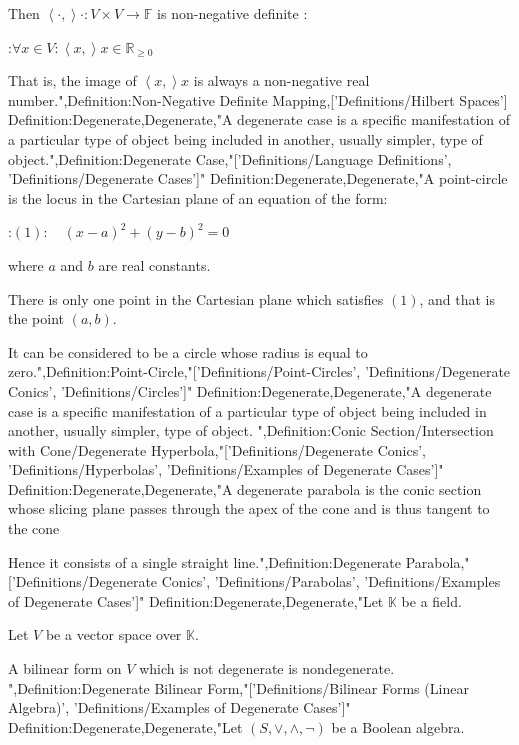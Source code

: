 Then $\left\langle \cdot,   \right\rangle\cdot: V \times V \to \mathbb F$ is non-negative definite :

:$\forall x \in V: \left\langle x,   \right\rangle x \in \mathbb R_{\ge 0}$


That is, the image of $\left\langle x,   \right\rangle x$ is always a non-negative real number.",Definition:Non-Negative Definite Mapping,['Definitions/Hilbert Spaces']
Definition:Degenerate,Degenerate,"A degenerate case is a specific manifestation of a particular type of object being included in another, usually simpler, type of object.",Definition:Degenerate Case,"['Definitions/Language Definitions', 'Definitions/Degenerate Cases']"
Definition:Degenerate,Degenerate,"A point-circle is the locus in the Cartesian plane of an equation of the form:

:$(1): \quad \left( x - a \right)^2 + \left( y - b \right)^2 = 0$

where $a$ and $b$ are real constants.


There is only one point in the Cartesian plane which satisfies $(1)$, and that is the point $\left( a, b \right)$.

It can be considered to be a circle whose radius is equal to zero.",Definition:Point-Circle,"['Definitions/Point-Circles', 'Definitions/Degenerate Conics', 'Definitions/Circles']"
Definition:Degenerate,Degenerate,"A degenerate case is a specific manifestation of a particular type of object being included in another, usually simpler, type of object.
",Definition:Conic Section/Intersection with Cone/Degenerate Hyperbola,"['Definitions/Degenerate Conics', 'Definitions/Hyperbolas', 'Definitions/Examples of Degenerate Cases']"
Definition:Degenerate,Degenerate,"A degenerate parabola is the conic section whose slicing plane passes through the apex of the cone and is thus tangent to the cone

Hence it consists of a single straight line.",Definition:Degenerate Parabola,"['Definitions/Degenerate Conics', 'Definitions/Parabolas', 'Definitions/Examples of Degenerate Cases']"
Definition:Degenerate,Degenerate,"Let $\mathbb K$ be a field.

Let $V$ be a vector space over $\mathbb K$.


A bilinear form on $V$ which is not degenerate is nondegenerate.
",Definition:Degenerate Bilinear Form,"['Definitions/Bilinear Forms (Linear Algebra)', 'Definitions/Examples of Degenerate Cases']"
Definition:Degenerate,Degenerate,"Let $\left( S, \vee, \wedge, \neg \right)$ be a Boolean algebra.


